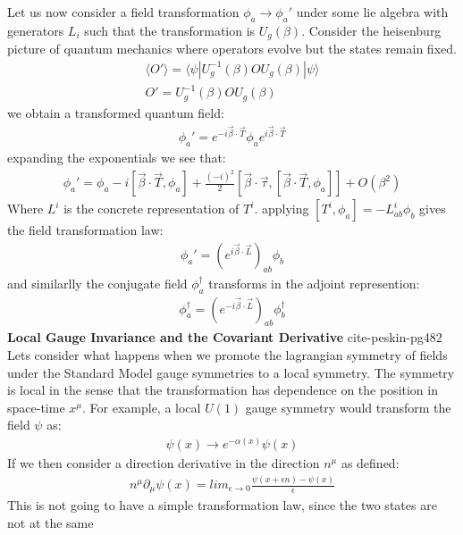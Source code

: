 Let us now consider a field transformation $\phi_a \rightarrow \phi_a'$ under some lie algebra with
generators $L_i$ such that the transformation is $U_g(\beta)$. Consider the heisenburg picture of quantum mechanics where operators evolve but 
the states remain fixed. 
\begin{align*}
\langle O' \rangle = \langle \psi | U_g^{-1}(\beta) O U_g(\beta) | \psi \rangle\\
O'= U_g^{-1}(\beta) O U_g(\beta)
\end{align*}
we obtain a transformed quantum field:
\begin{align*}
\phi_a' = e^{-i \vec \beta \cdot \vec T} \phi_a e^{i \vec \beta \cdot \vec T}
\end{align*}
expanding the exponentials we see that:
\begin{align*}
\phi_a' = \phi_a - i [ \vec \beta \cdot \vec T, \phi_a] + \frac{(-i)^2}{2}[ \vec \beta \cdot \vec \tau, [ \vec \beta \cdot \vec T, \phi_a]] + O(\beta^2)
\end{align*}
Where $L^i$ is the concrete representation of $T^i$. applying $[T^i, \phi_a] = - L_{ab}^i \phi_b$ gives the field transformation law:
\begin{align*}
\phi_a' = \left (e^{i \vec \beta \cdot \vec L} \right)_{ab} \phi_b 
\end{align*}
and similarlly the conjugate field $\phi^\dagger_a$ transforms in the adjoint represention:
\begin{align*}
\phi_a^\dagger = \left( e^{-i \vec \beta \cdot \vec L} \right)_{ab} \phi^\dagger_b 
\end{align*}
\textbf{Local Gauge Invariance and the Covariant Derivative} 
cite-peskin-pg482 Lets consider what happens when we promote the lagrangian symmetry of fields under the Standard Model gauge symmetries to a local symmetry. The symmetry is local in the sense that the transformation has dependence on the position in space-time $x^\mu$. For example, a local $U(1)$ gauge symmetry would transform the field $\psi$ as:
\begin{align*}
\psi(x) \rightarrow e^{- \alpha(x)} \psi(x)
\end{align*}
If we then consider a direction derivative in the direction $n^\mu$ as defined:
\begin{align*}
n^\mu \partial _\mu \psi (x) = lim_{\epsilon\rightarrow 0} \frac{\psi(x + \epsilon n) - \psi(x)}{\epsilon}
\end{align*}
This is not going to have a simple transformation law, since the two states are not at the same
